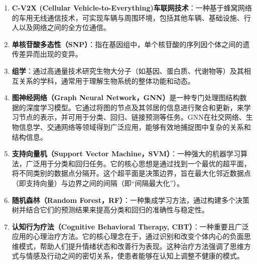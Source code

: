 \begin{enumerate}
\item \textbf{C-V2X (Cellular Vehicle-to-Everything)车联网技术}：一种基于蜂窝网络的车用无线通信技术，可实现车辆与周围环境，包括其他车辆、基础设施、行人以及网络之间的全方位通信。
\item \textbf{ 单核苷酸多态性（SNP）}：指在基因组中，单个核苷酸的序列因个体之间的遗传差异而出现的变异。
\item \textbf{组学}：通过高通量技术研究生物大分子（如基因、蛋白质、代谢物等）及其相互关系的学科，通常用于理解生物系统的整体功能和动态。
\item \textbf{图神经网络（Graph Neural Network，GNN）}是一种专门处理图结构数据的深度学习模型。它通过将图的节点及其邻居的信息进行聚合和更新，来学习节点的表示，并可用于分类、回归、链接预测等任务。GNN在社交网络、生物信息学、交通网络等领域得到广泛应用，能够有效地捕捉图中复杂的关系和结构信息。
\item \textbf{支持向量机（Support Vector Machine，SVM）}：一种强大的机器学习算法，广泛用于分类和回归任务。它的核心思想是通过找到一个最优的超平面，将不同类别的数据点分隔开。这个超平面是决策边界，旨在最大化邻近数据点（即支持向量）与边界之间的间隔（即“间隔最大化”）。
\item \textbf{随机森林（Random Forest，RF）}：一种集成学习方法，通过构建多个决策树并结合它们的预测结果来提高分类和回归的准确性与稳定性。
\item \textbf{认知行为疗法（Cognitive Behavioral Therapy, CBT）}：一种重要且广泛应用的心理治疗方法。它的核心理念在于，通过识别和改变个体内心的负面思维模式，帮助人们提升情绪状态和改善行为表现。这种治疗方法强调了思维方式与情感及行动之间的密切关系，使患者能够在认知上调整不健康的模式。

\end{enumerate}

